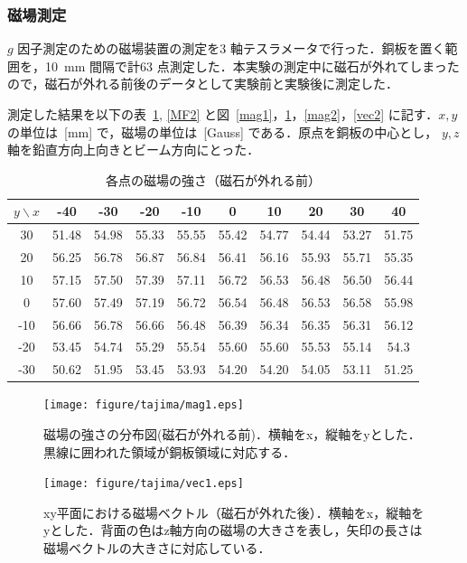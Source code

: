 \newpage

\subsubsection{磁場測定}
$g$ 因子測定のための磁場装置の測定を3 軸テスラメータで行った．銅板を置く範囲を，10~mm 間隔で計63 点測定した．本実験の測定中に磁石が外れてしまったので，磁石が外れる前後のデータとして実験前と実験後に測定した．

測定した結果を以下の表~\ref{MF1}, \ref{MF2} と図~\ref{mag1}，\ref{vec1}，\ref{mag2}，\ref{vec2} に記す．$x, y$の単位は~[mm] で，磁場の単位は~[Gauss] である．原点を銅板の中心とし， $y, z$軸を鉛直方向上向きとビーム方向にとった．
\begin{table}[H]
\centering
\caption{各点の磁場の強さ（磁石が外れる前）}\label{MF1}
\begin{tabular}{|c||c|c|c|c|c|c|c|c|c|}\hline
$y \backslash x$ & -40 & -30 & -20 & -10 & 0 & 10 & 20 & 30 & 40 \\ \hline \hline
30 & 51.48 & 54.98 & 55.33 & 55.55 & 55.42 & 54.77 & 54.44 & 53.27 & 51.75 \\ \hline
20 & 56.25 & 56.78 & 56.87 & 56.84 & 56.41 & 56.16 & 55.93 & 55.71 & 55.35 \\ \hline
10 & 57.15 & 57.50 & 57.39 & 57.11 & 56.72 & 56.53 & 56.48 & 56.50 & 56.44 \\ \hline
0 & 57.60 & 57.49 & 57.19 & 56.72 & 56.54 & 56.48 & 56.53 & 56.58 & 55.98 \\ \hline
-10 & 56.66 & 56.78 & 56.66 & 56.48 & 56.39 & 56.34 & 56.35 & 56.31 & 56.12 \\ \hline
-20 & 53.45 & 54.74 & 55.29 & 55.54 & 55.60 & 55.60 & 55.53 & 55.14 & 54.3 \\ \hline
-30 & 50.62 & 51.95 & 53.45 & 53.93 & 54.20 & 54.20 & 54.05 & 53.11 & 51.25 \\ \hline
\end{tabular}
\end{table}
\begin{figure}[H]
\centering
\begin{minipage}{0.45\hsize}
\centering
\texttt{[image: figure/tajima/mag1.eps]}
\caption{磁場の強さの分布図(磁石が外れる前)．横軸をx，縦軸をyとした．黒線に囲われた領域が銅板領域に対応する．}
\label{mag1}
\end{minipage}
\begin{minipage}{0.45\hsize}
\centering
\texttt{[image: figure/tajima/vec1.eps]}
\caption{xy平面における磁場ベクトル（磁石が外れた後）．横軸をx，縦軸をyとした．背面の色はz軸方向の磁場の大きさを表し，矢印の長さは磁場ベクトルの大きさに対応している．}
\label{vec1}
\end{minipage}
\end{figure}



